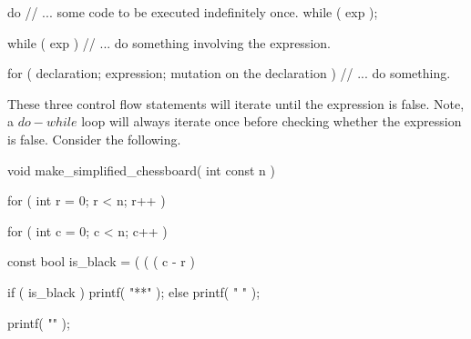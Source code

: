 \begin{code}[c]
do {
	// ... some code to be executed indefinitely once.
} while ( exp );

while ( exp ) {
	// ... do something involving the expression.
}

for ( declaration; expression; mutation on the declaration ) {
	// ... do something.
}
\end{code}

These three control flow statements will iterate until the expression is false. Note, a $do-while$ loop will always iterate once before checking whether the expression is false. Consider the following.\\


\begin{code}[c]
void make_simplified_chessboard( int const n ) {
	for ( int r = 0; r < n; r++ ) {
		for ( int c = 0; c < n;  c++ ) {
			const bool is_black = ( ( ( c - r ) %
			
			if ( is_black ) {
				printf( "**" );
			} else {
				printf( "  " );
			}
		}
		
		printf( "\n" );
	}
}
\end{code}

\clearpage
{}